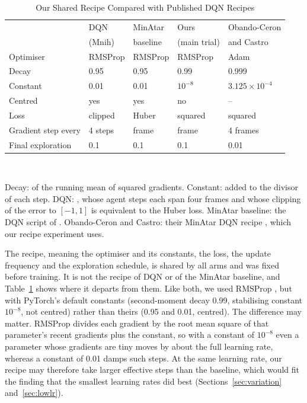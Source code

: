 \documentclass[conference,a4paper]{IEEEtran}
\begin{document}
\begin{table}[t]
\caption{Our Shared Recipe Compared with Published DQN Recipes}
\label{tab:recipes}
\centering
\footnotesize
\setlength{\tabcolsep}{3pt}
\begin{tabular}{@{}lllll@{}}
\toprule
 & DQN & MinAtar & Ours & Obando-Ceron \\
 & (Mnih) & baseline & (main trial) & and Castro \\
\midrule
Optimiser & RMSProp & RMSProp & RMSProp & Adam \\
Decay & 0.95 & 0.95 & 0.99 & 0.999 \\
Constant & 0.01 & 0.01 & $10^{-8}$ & $3.125{\times}10^{-4}$ \\
Centred & yes & yes & no & -- \\
Loss & clipped & Huber & squared & squared \\
Gradient step every & 4 steps & frame & frame & 4 frames \\
Final exploration & 0.1 & 0.1 & 0.1 & 0.01 \\
\bottomrule
\end{tabular}\\[3pt]
\parbox{\columnwidth}{\scriptsize Decay: of the running mean of squared gradients. Constant: added to the divisor of each step. DQN: \citet{mnih2015human}, whose agent steps each span four frames and whose
clipping of the error to $[-1,1]$ is equivalent to the Huber loss. MinAtar baseline: the DQN script of
\citet{young2019minatar}. Obando-Ceron and Castro: their MinAtar DQN recipe \citep{obandoceron2021revisiting}, which our
recipe experiment uses.}
\end{table}

The recipe, meaning the optimiser and its constants, the loss, the update frequency and the exploration schedule, is
shared by all arms and was fixed before training. It is not the recipe of DQN or of the MinAtar baseline, and
Table~\ref{tab:recipes} shows where it departs from them. Like both, we used RMSProp \citep{tieleman2012rmsprop}, but
with PyTorch's default constants (second-moment decay 0.99, stabilising constant $10^{-8}$, not centred) rather than
theirs (0.95 and 0.01, centred). The difference may matter. RMSProp divides each gradient by the root mean square of
that parameter's recent gradients plus the constant, so with a constant of $10^{-8}$ even a parameter whose gradients
are tiny moves by about the full learning rate, whereas a constant of 0.01 damps such steps. At the same learning rate,
our recipe may therefore take larger effective steps than the baseline, which would fit the finding that the smallest
learning rates did best (Sections~\ref{sec:variation} and~\ref{sec:lowlr}).
\end{document}

